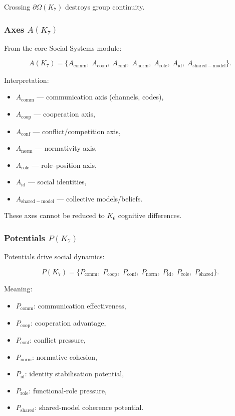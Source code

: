 Crossing $\partial\Omega(K_7)$ destroys group continuity.

\subsubsection{Axes \texorpdfstring{$A(K_7)$}{A(K_7)}}

From the core Social Systems module:

\[
A(K_7)=
\{
A_{\mathrm{comm}},\;
A_{\mathrm{coop}},\;
A_{\mathrm{conf}},\;
A_{\mathrm{norm}},\;
A_{\mathrm{role}},\;
A_{\mathrm{id}},\;
A_{\mathrm{shared-model}}
\}.
\]

Interpretation:
\begin{itemize}
    \item $A_{\mathrm{comm}}$ — communication axis (channels, codes),
    \item $A_{\mathrm{coop}}$ — cooperation axis,
    \item $A_{\mathrm{conf}}$ — conflict/competition axis,
    \item $A_{\mathrm{norm}}$ — normativity axis,
    \item $A_{\mathrm{role}}$ — role–position axis,
    \item $A_{\mathrm{id}}$ — social identities,
    \item $A_{\mathrm{shared-model}}$ — collective models/beliefs.
\end{itemize}

These axes cannot be reduced to $K_6$ cognitive differences.

\subsubsection{Potentials \texorpdfstring{$P(K_7)$}{P(K_7)}}

Potentials drive social dynamics:

\[
P(K_7)=
\{
P_{\mathrm{comm}},\;
P_{\mathrm{coop}},\;
P_{\mathrm{conf}},\;
P_{\mathrm{norm}},\;
P_{\mathrm{id}},\;
P_{\mathrm{role}},\;
P_{\mathrm{shared}}
\}.
\]

Meaning:
\begin{itemize}
    \item $P_{\mathrm{comm}}$: communication effectiveness,
    \item $P_{\mathrm{coop}}$: cooperation advantage,
    \item $P_{\mathrm{conf}}$: conflict pressure,
    \item $P_{\mathrm{norm}}$: normative cohesion,
    \item $P_{\mathrm{id}}$: identity stabilisation potential,
    \item $P_{\mathrm{role}}$: functional-role pressure,
    \item $P_{\mathrm{shared}}$: shared-model coherence potential.
\end{itemize}

